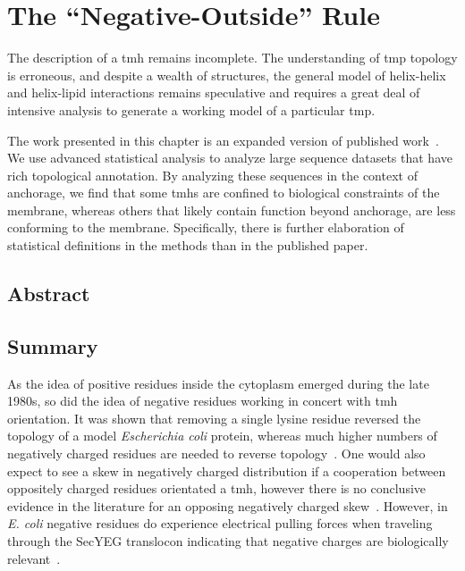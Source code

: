 
\chapter{The ``Negative-Outside'' Rule}

The description of a \gls{tmh} remains incomplete. The understanding of \gls{tmp} topology is erroneous, and despite a wealth of structures, the general model of helix-helix and helix-lipid interactions remains speculative and requires a great deal of intensive analysis to generate a working model of a particular \gls{tmp}.

The work presented in this chapter is an expanded version of published work~\cite{Baker2016}. We use advanced statistical analysis to analyze large sequence datasets that have rich topological annotation. By analyzing these sequences in the context of anchorage, we find that some \gls{tmh}s are confined to biological constraints of the membrane, whereas others that likely contain function beyond anchorage, are less conforming to the membrane. Specifically, there is further elaboration of statistical definitions in the methods than in the published paper.



\section{Abstract}

\section{Summary}
As the idea of positive residues inside the cytoplasm emerged during the late 1980s, so did the idea of negative residues working in concert with \gls{tmh} orientation. It was shown that removing a single lysine residue reversed the topology of a model {\it Escherichia coli} protein, whereas much higher numbers of negatively charged residues are needed to reverse topology~\cite{Nilsson1990}. One would also expect to see a skew in negatively charged distribution if a cooperation between oppositely charged residues orientated a \gls{tmh}, however there is no conclusive evidence in the literature for an opposing negatively charged skew~\cite{Granseth2005, Nilsson2005, Sharpe2010, Baeza-Delgado2013, Pogozheva2013}. However, in {\it E. coli} negative residues do experience electrical pulling forces when traveling through the SecYEG translocon indicating that negative charges are biologically relevant~\cite{Ismail2015}.


